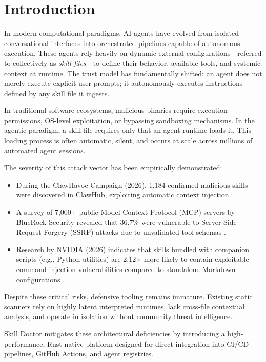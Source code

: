 \documentclass[11pt,a4paper]{article}
\begin{document}
\section{Introduction}

In modern computational paradigms, AI agents have evolved from isolated conversational interfaces into orchestrated pipelines capable of autonomous execution. These agents rely heavily on dynamic external configurations---referred to collectively as \textit{skill files}---to define their behavior, available tools, and systemic context at runtime. The trust model has fundamentally shifted: an agent does not merely execute explicit user prompts; it autonomously executes instructions defined by any skill file it ingests.

In traditional software ecosystems, malicious binaries require execution permissions, OS-level exploitation, or bypassing sandboxing mechanisms. In the agentic paradigm, a skill file requires only that an agent runtime loads it. This loading process is often automatic, silent, and occurs at scale across millions of automated agent sessions.

The severity of this attack vector has been empirically demonstrated:
\begin{itemize}
    \item During the ClawHavoc Campaign (2026), 1,184 confirmed malicious skills were discovered in ClawHub, exploiting automatic context injection.
    \item A survey of 7,000+ public Model Context Protocol (MCP) servers by BlueRock Security revealed that 36.7\% were vulnerable to Server-Side Request Forgery (SSRF) attacks due to unvalidated tool schemas \cite{bluerock2026}.
    \item Research by NVIDIA (2026) indicates that skills bundled with companion scripts (e.g., Python utilities) are 2.12$\times$ more likely to contain exploitable command injection vulnerabilities compared to standalone Markdown configurations \cite{nvidia2026}.
\end{itemize}

Despite these critical risks, defensive tooling remains immature. Existing static scanners rely on highly latent interpreted runtimes, lack cross-file contextual analysis, and operate in isolation without community threat intelligence.

Skill Doctor mitigates these architectural deficiencies by introducing a high-performance, Rust-native platform designed for direct integration into CI/CD pipelines, GitHub Actions, and agent registries.
\end{document}
